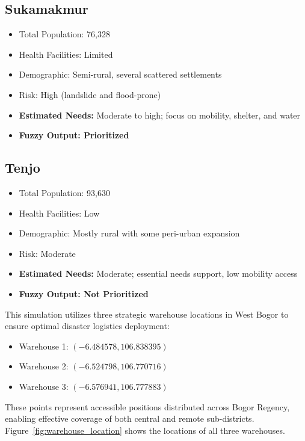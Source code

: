 \documentclass[conference,final,a4paper,twoside,10pt]{IEEEtran}
\begin{document}
\subsection*{Sukamakmur}
\begin{itemize}
    \item Total Population: 76,328
    \item Health Facilities: Limited
    \item Demographic: Semi-rural, several scattered settlements
    \item Risk: High (landslide and flood-prone)
    \item \textbf{Estimated Needs:} Moderate to high; focus on mobility, shelter, and water
    \item \textbf{Fuzzy Output: Prioritized}
\end{itemize}
\subsection*{Tenjo}
\begin{itemize}
    \item Total Population: 93,630
    \item Health Facilities: Low
    \item Demographic: Mostly rural with some peri-urban expansion
    \item Risk: Moderate
    \item \textbf{Estimated Needs:} Moderate; essential needs support, low mobility access
    \item \textbf{Fuzzy Output: Not Prioritized}
\end{itemize}
This simulation utilizes three strategic warehouse locations in West Bogor to ensure optimal disaster logistics deployment:

\begin{itemize}
    \item Warehouse 1: \((-6.484578, 106.838395)\)
    \item Warehouse 2: \((-6.524798, 106.770716)\)
    \item Warehouse 3: \((-6.576941, 106.777883)\)
\end{itemize}

These points represent accessible positions distributed across Bogor Regency, enabling effective coverage of both central and remote sub-districts. Figure~\ref{fig:warehouse_location} shows the locations of all three warehouses. 
\end{document}
